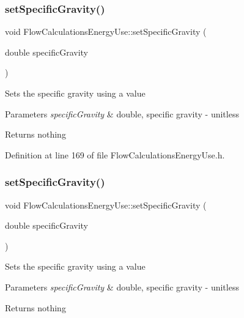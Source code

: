 \subsubsection{\texorpdfstring{set\+Specific\+Gravity()}{setSpecificGravity()}\hspace{0.1cm}{\footnotesize\ttfamily [1/3]}}
{\footnotesize\ttfamily void Flow\+Calculations\+Energy\+Use\+::set\+Specific\+Gravity (\begin{DoxyParamCaption}\item[{double}]{specific\+Gravity }\end{DoxyParamCaption})\hspace{0.3cm}{\ttfamily [inline]}}

Sets the specific gravity using a value


\begin{DoxyParams}{Parameters}
{\em specific\+Gravity} & double, specific gravity -\/ unitless\\
\hline
\end{DoxyParams}
\begin{DoxyReturn}{Returns}
nothing 
\end{DoxyReturn}


Definition at line 169 of file Flow\+Calculations\+Energy\+Use.\+h.

\mbox{\label{class_flow_calculations_energy_use_abafa34d337124a1487fb0c871ea8a24a}} 
\subsubsection{\texorpdfstring{set\+Specific\+Gravity()}{setSpecificGravity()}\hspace{0.1cm}{\footnotesize\ttfamily [2/3]}}
{\footnotesize\ttfamily void Flow\+Calculations\+Energy\+Use\+::set\+Specific\+Gravity (\begin{DoxyParamCaption}\item[{double}]{specific\+Gravity }\end{DoxyParamCaption})\hspace{0.3cm}{\ttfamily [inline]}}

Sets the specific gravity using a value


\begin{DoxyParams}{Parameters}
{\em specific\+Gravity} & double, specific gravity -\/ unitless\\
\hline
\end{DoxyParams}
\begin{DoxyReturn}{Returns}
nothing 
\end{DoxyReturn}


